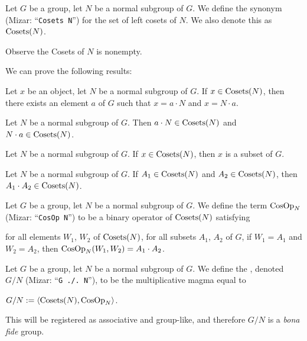 \documentclass{article}
\begin{document}
\begin{notation}
Let $G$ be a group, let $N$ be a normal subgroup of $G$. We define the
synonym  (Mizar: ``\verb#Cosets N#'') for the set
of left cosets of $N$. We also denote this as $\operatorname{Cosets}(N)$.
\end{notation}

Observe the Cosets of $N$ is nonempty.

We can prove the following results:
\begin{thm}
\item\label{group6:13} Let $x$ be an object, let $N$ be a normal
  subgroup of $G$. If $x\in\operatorname{Cosets}(N)$, then there exists an element $a$
  of $G$ such that $x=a\cdot N$ and $x=N\cdot a$.
\item\label{group6:14} Let $N$ be a normal subgroup of $G$.
  Then $a\cdot N\in\operatorname{Cosets}(N)$ and $N\cdot a\in\operatorname{Cosets}(N)$.
\item\label{group6:15} Let $N$ be a normal subgroup of $G$. If
  $x\in\operatorname{Cosets}(N)$, then $x$ is a subset of $G$.
\item\label{group6:16} Let $N$ be a normal subgroup of $G$.
  If $A_{1}\in\operatorname{Cosets}(N)$ and $A_{2}\in\operatorname{Cosets}(N)$,
  then $A_{1}\cdot A_{2}\in\operatorname{Cosets}(N)$.
\end{thm}

\begin{definition}
Let $G$ be a group, let $N$ be a normal subgroup of $G$.
We define the term $\operatorname{CosOp}_{N}$ (Mizar: ``\verb#CosOp N#'') to be a
binary operator of $\operatorname{Cosets}(N)$ satisfying
\begin{defn}
\item for all elements $W_{1}$, $W_{2}$ of $\operatorname{Cosets}(N)$,
  for all subsets $A_{1}$, $A_{2}$ of $G$, if $W_{1}=A_{1}$ and $W_{2}=A_{2}$,
  then $\operatorname{CosOp}_{N}(W_{1},W_{2})=A_{1}\cdot A_{2}$.
\end{defn}
\end{definition}

\begin{definition}
Let $G$ be a group, let $N$ be a normal subgroup of $G$.
We define the , denoted $G/N$ (Mizar: ``\verb#G ./. N#''), to be the
multiplicative magma equal to
\begin{defn}
\item $G/N:=\langle\operatorname{Cosets}(N),\operatorname{CosOp}_{N}\rangle$.
\end{defn}
\end{definition}
\begin{remark}
This will be registered as associative and group-like, and therefore
$G/N$ is a \textit{bona fide} group.
\end{remark}
\end{document}
